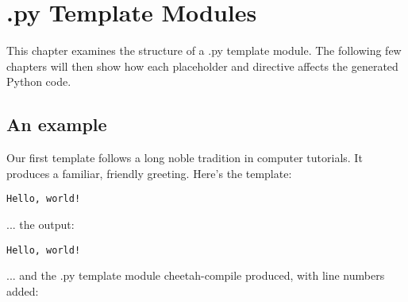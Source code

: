 \section{.py Template Modules}
\label{pyModules}

This chapter examines the structure of a .py template module.  The following
few chapters will then show how each placeholder and directive affects the
generated Python code.

\subsection{An example}
\label{pyModules.example}

Our first template follows a long noble tradition in computer tutorials.
It produces a familiar, friendly greeting.  Here's the template:

\begin{verbatim}
Hello, world!
\end{verbatim}

... the output:

\begin{verbatim}
Hello, world!
\end{verbatim}

... and the .py template module cheetah-compile produced, with line
numbers added:


